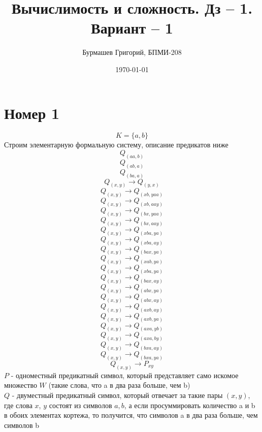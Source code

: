 \documentclass[a4paper,12pt]{article}
\author{Бурмашев Григорий, БПМИ-208}
\title{Вычислимость и сложность. Дз -- 1. Вариант -- 1}
\date{\today}
\begin{document}
\maketitle
\clearpage
\section*{Номер 1}
\[
K = \{ a, b\}
\]
Строим элементарную формальную систему, описание предикатов ниже
\[
Q_{(aa, b)}
\]
\[
Q_{(ab, a)}
\]
\[
Q_{(ba, a)}
\]
\[
Q_{(x, y)} \rightarrow Q_{(y, x)}
\]
\[
Q_{(x, y)} \rightarrow Q_{(xb, yaa)}
\]
\[
Q_{(x, y)} \rightarrow Q_{(xb, aay)}
\]
\[
Q_{(x, y)} \rightarrow Q_{(bx, yaa)}
\]
\[
Q_{(x, y)} \rightarrow Q_{(bx, aay)}
\]
\[
Q_{(x, y)} \rightarrow Q_{(xba, ya)}
\]
\[
Q_{(x, y)} \rightarrow Q_{(xba, ay)}
\]
\[
Q_{(x, y)} \rightarrow Q_{(bax, ya)}
\]
\[
Q_{(x, y)} \rightarrow Q_{(xab, ya)}
\]
\[
Q_{(x, y)} \rightarrow Q_{(xba, ya)}
\]
\[
Q_{(x, y)} \rightarrow Q_{(bax, ay)}
\]
\[
Q_{(x, y)} \rightarrow Q_{(abx, ya)}
\]
\[
Q_{(x, y)} \rightarrow Q_{(abx, ay)}
\]
\[
Q_{(x, y)} \rightarrow Q_{(axb, ay)}
\]
\[
Q_{(x, y)} \rightarrow Q_{(axb, ya)}
\]
\[
Q_{(x, y)} \rightarrow Q_{(axa, yb)}
\]
\[
Q_{(x, y)} \rightarrow Q_{(axa, by)}
\]
\[
Q_{(x, y)} \rightarrow Q_{(bxa, ay)}
\]
\[
Q_{(x, y)} \rightarrow Q_{(bxa, ya)}
\]
\[
Q_{(x, y)} \rightarrow P_{xy}
\]
$P$ - одноместный предикатный символ, который представляет само искомое множество $W$ (такие слова, что a в два раза больше, чем b)
\\
$Q$ - двуместный предикатный символ, который отвечает за такие пары $(x, y)$, где слова $x$, $y$ состоят из символов $a, b$, а если просуммировать количество a и b в обоих элементах кортежа, то получится, что символов a в два раза больше, чем символов b
\clearpage
\end{document}

